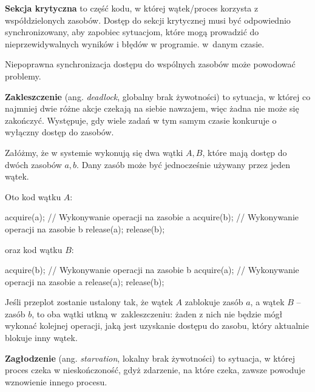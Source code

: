 \textbf{Sekcja krytyczna} to część kodu, w której wątek/proces  korzysta z współdzielonych zasobów. Dostęp do sekcji krytycznej musi być odpowiednio synchronizowany, aby zapobiec sytuacjom, które mogą prowadzić do nieprzewidywalnych wyników i błędów w programie.  w~danym czasie.
\bigskip

Niepoprawna synchronizacja dostępu do wspólnych zasobów może powodować problemy.

\textbf{Zakleszczenie} (ang. \textit{deadlock}, globalny brak żywotności) to sytuacja, w której co najmniej dwie różne akcje czekają na siebie nawzajem, więc żadna nie może się zakończyć. Występuje, gdy wiele zadań w tym samym czasie konkuruje o wyłączny dostęp do zasobów.

\begin{example}
    Załóżmy, że w systemie wykonują się dwa wątki $A, B$, które mają dostęp do dwóch zasobów $a, b$. Dany zasób może być jednocześnie używany przez jeden wątek.

    Oto kod wątku $A$:
    \begin{java}
        acquire(a); // Wykonywanie operacji na zasobie a
        acquire(b); // Wykonywanie operacji na zasobie b
        release(a);
        release(b);
    \end{java}
    oraz kod wątku $B$:
    \begin{java}
        acquire(b); // Wykonywanie operacji na zasobie b
        acquire(a); // Wykonywanie operacji na zasobie a
        release(a);
        release(b);
    \end{java}

    Jeśli przeplot zostanie ustalony tak, że wątek $A$ zablokuje zasób $a$, a wątek $B$ -- zasób $b$, to oba wątki utkną w~zakleszczeniu: żaden z nich nie będzie mógł wykonać kolejnej operacji, jaką jest uzyskanie dostępu do zasobu, który aktualnie blokuje inny wątek.
\end{example}

\textbf{Zagłodzenie} (ang. \textit{starvation}, lokalny brak żywotności) to sytuacja, w której proces czeka w nieskończoność, gdyż zdarzenie, na które czeka, zawsze powoduje wznowienie innego procesu.

